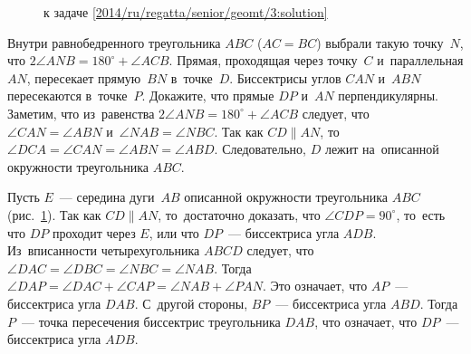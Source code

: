 \ifsolution
\begin{figure}\centering
    \caption{к задаче \ref{2014/ru/regatta/senior/geomt/3:solution}}
    \label{2014/ru/regatta/senior/geomt/3:solution:fig}
\end{figure}%
\fi %

\problem
Внутри равнобедренного треугольника $ABC$ ($AC = BC$) выбрали такую точку~$N$, 
что $2 \angle ANB = 180^\circ + \angle ACB$.
Прямая, проходящая через точку~$C$ и~параллельная $AN$, пересекает прямую~$BN$
в~точке~$D$.
Биссектрисы углов $CAN$ и~$ABN$ пересекаются в~точке~$P$.
Докажите, что прямые $DP$ и~$AN$ перпендикулярны.
\solution\label{2014/ru/regatta/senior/geomt/3:solution}
Заметим, что из~равенства $2 \angle ANB = 180^\circ + \angle ACB$ следует, что
$\angle CAN=\angle ABN$ и~$\angle NAB=\angle NBC$.
Так как $CD \parallel AN$,
то~$\angle DCA = \angle CAN = \angle ABN = \angle ABD$.
Следовательно, $D$ лежит на~описанной окружности треугольника $ABC$.
\par
Пусть $E$~--- середина дуги~$AB$ описанной окружности треугольника $ABC$
(рис.~\ref{2014/ru/regatta/senior/geomt/3:solution:fig}).
Так как $CD \parallel AN$, то~достаточно доказать, что $\angle CDP = 90^\circ$,
то~есть что $DP$ проходит через $E$, или что $DP$~--- биссектриса угла $ADB$.
Из~вписанности четырехугольника $ABCD$ следует, что
$\angle DAC = \angle DBC = \angle NBC = \angle NAB$.
Тогда $\angle DAP = \angle DAC + \angle CAP = \angle NAB + \angle PAN$.
Это означает, что $AP$~--- биссектриса угла $DAB$.
С~другой стороны, $BP$~--- биссектриса угла $ABD$.
Тогда $P$~--- точка пересечения биссектрис треугольника $DAB$, что означает,
что $DP$~--- биссектриса угла $ADB$.
\endproblem

